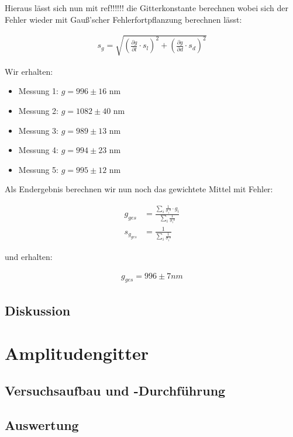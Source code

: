 \documentclass[12pt]{article}
\newcommand{\del}[2][]{\frac{\partial #1}{\partial #2}}
\begin{document}
Hieraus lässt sich nun mit ref!!!!!! die Gitterkonstante berechnen wobei sich der Fehler wieder mit Gauß'scher Fehlerfortpflanzung berechnen lässt:

\begin{align*}
s_g = \sqrt{\left(\del[g]{l}\cdot s_{l}\right)^2+\left(\del[g]{d}\cdot s_{d}\right)^2}
\end{align*}

Wir erhalten:

\begin{itemize}
\item Messung 1: $g = 996 \pm 16$ nm
\item Messung 2: $g = 1082 \pm 40$ nm
\item Messung 3: $g = 989 \pm 13$ nm
\item Messung 4: $g = 994 \pm 23$ nm
\item Messung 5: $g = 995 \pm 12$ nm
\end{itemize}

Als Endergebnis berechnen wir nun noch das gewichtete Mittel mit Fehler:

\begin{align*}
g_{ges} &=\frac{\sum\limits_i \frac{1}{\sigma_i²} \cdot g_i}{\sum\limits_i \frac{1}{\sigma_i²}}\\
s_{g_{ges}} &= \frac{1}{\sum\limits_i \frac{1}{\sigma_i²}}
\end{align*}

und erhalten:

\begin{align*}
g_{ges} = 996 \pm 7 nm
\end{align*}

\newpage
\subsection{Diskussion}

\newpage
\section{Amplitudengitter}

\newpage
\subsection{Versuchsaufbau und -Durchführung}





\newpage
\subsection{Auswertung}
\end{document}
